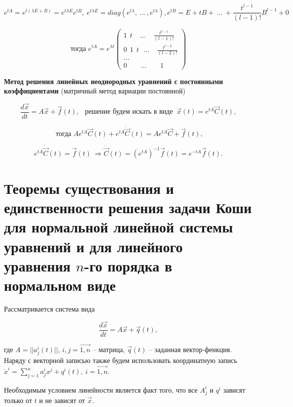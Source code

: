 \[ e^{tA} = e^{t(\lambda E + B)} = e^{t\lambda E}e^{tB},\ e^{t\lambda E} = diag(e^{t\lambda},\ ...\ , e^{t\lambda}), e^{tB} = E + tB +\ ...\ + \frac{t^{l-1}}{(l-1)!}B^{l-1} + 0 \]

\begin{equation*}
	\text{тогда } e^{tA} = e^{\lambda t}
 	\begin{pmatrix}
            1\ \ t\ \ \ \ \  \dots\ \ \ \ \ \frac{t^{l-1}}{(l-1)!} \\
            0\ \ 1\ \ t\ \ \ \dots\ \ \ \ \  \frac{t^{l-2}}{(l-2)!} \\
            \dots \\
            0\ \ \ \ \ \ \ \ \ \dots\ \ \ \ \ \ \ \ \  1
    \end{pmatrix}
\end{equation*}

\textbf{Метод решения линейных неоднородных уравнений с постоянными коэффициентами} (матричный метод вариации постоянной)

\[ \frac{d\vec{x}}{dt} = A\vec{x} + \vec{f}(t),\ \ \text{ решение будем искать в виде } \ \vec{x}(t) = e^{tA}\vec{C}(t), \]

\[ \text{ тогда } Ae^{tA}\vec{C}(t) + e^{tA}\dot{\vec{C}}(t) = Ae^{tA}\vec{C} + \vec{f}(t),\]

\[ e^{tA}\dot{\vec{C}}(t) = \vec{f}(t)\ \Rightarrow \dot{\vec{C}}(t) = (e^{tA})^{-1}\vec{f}(t) = e^{-tA}\vec{f}(t). \]

\newpage

\section{Теоремы существования и единственности решения задачи Коши для нормальной линейной системы уравнений и
для линейного уравнения $n$-го порядка в нормальном виде}

Рассматривается система вида 

\begin{equation}
	\frac{d\vec{x}}{dt} = A\vec{x} + \vec{q}(t),
	\label{Issue5_2}
\end{equation} 

где $A = ||a_j^i(t)||$, $i,j = \vec{1,n}$ -- матрица, $\vec{q}(t)$ -- заданная вектор-фенкция. Наряду с векторной записью также будем использовать координатную запись $\dot{x}^i = \sum\limits_{j = 1}^{n} a_j^i x^j + q^i(t),\ i = \vec{1,n}$.

$\textbf{Необходимым условием линейности}$ является факт того, что все $A_j^i$ и $q^i$ зависят только от $t$ и не зависят от $\vec{x}$.

